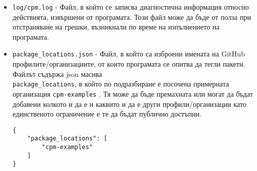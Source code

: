 \begin{itemize}
    \item \texttt{log/cpm.log} - Файл, в който се записва диагностична
          информация относно действията, извършени от програмата. Този файл може
          да бъде от полза при отстраняване на грешки, възникнали по време на
          изпълнението на програмата.
    \item \texttt{package\_locations.json} - Файл, в който са изброени имената
          на GitHub профилите/организациите, от които програмата се опитва да
          тегли пакети. Файлът съдържа json масива \\
          \texttt{package\_locations}, в който по подразбиране е посочена
          примерната организация \texttt{cpm-examples}
          . Тя може да бъде премахната
          или могат да бъдат добавени колкото и да е и каквито и да е други
          профили/организации като единственото ограничение е те да бъдат
          публично достъпни.

\begin{lstlisting}[style=json,
                   caption=package\_locations.json по подразбиране,
                   label={lst:default-package-locations}]
{
    "package_locations": [
        "cpm-examples"
    ]
}
\end{lstlisting}
\end{itemize}
